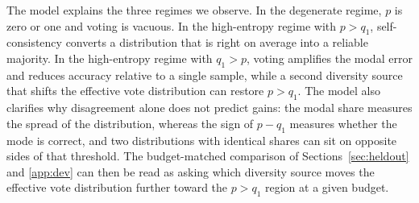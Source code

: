 The model explains the three regimes we observe. In the degenerate regime, $p$ is zero or one and voting is vacuous. In the high-entropy regime with $p > q_1$, self-consistency converts a distribution that is right on average into a reliable majority. In the high-entropy regime with $q_1 > p$, voting amplifies the modal error and reduces accuracy relative to a single sample, while a second diversity source that shifts the effective vote distribution can restore $p > q_1$. The model also clarifies why disagreement alone does not predict gains: the modal share measures the spread of the distribution, whereas the sign of $p - q_1$ measures whether the mode is correct, and two distributions with identical shares can sit on opposite sides of that threshold. The budget-matched comparison of Sections~\ref{sec:heldout} and \ref{app:dev} can then be read as asking which diversity source moves the effective vote distribution further toward the $p > q_1$ region at a given budget.
